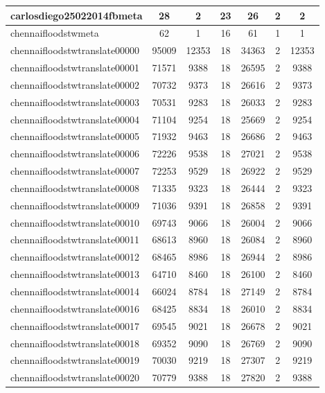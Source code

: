 \begin{table*}[h!]
\begin{center}
\begin{tabular}{| l | c | c | c | c | c | c |}
carlosdiego25022014fbmeta & 28  & 2  & 23  & 26  & 2  & 2 \\\hline
chennaifloodstwmeta & 62  & 1  & 16  & 61  & 1  & 1 \\\hline
chennaifloodstwtranslate00000 & 95009  & 12353  & 18  & 34363  & 2  & 12353 \\\hline
chennaifloodstwtranslate00001 & 71571  & 9388  & 18  & 26595  & 2  & 9388 \\\hline
chennaifloodstwtranslate00002 & 70732  & 9373  & 18  & 26616  & 2  & 9373 \\\hline
chennaifloodstwtranslate00003 & 70531  & 9283  & 18  & 26033  & 2  & 9283 \\\hline
chennaifloodstwtranslate00004 & 71104  & 9254  & 18  & 25669  & 2  & 9254 \\\hline
chennaifloodstwtranslate00005 & 71932  & 9463  & 18  & 26686  & 2  & 9463 \\\hline
chennaifloodstwtranslate00006 & 72226  & 9538  & 18  & 27021  & 2  & 9538 \\\hline
chennaifloodstwtranslate00007 & 72253  & 9529  & 18  & 26922  & 2  & 9529 \\\hline
chennaifloodstwtranslate00008 & 71335  & 9323  & 18  & 26444  & 2  & 9323 \\\hline
chennaifloodstwtranslate00009 & 71036  & 9391  & 18  & 26858  & 2  & 9391 \\\hline
chennaifloodstwtranslate00010 & 69743  & 9066  & 18  & 26004  & 2  & 9066 \\\hline
chennaifloodstwtranslate00011 & 68613  & 8960  & 18  & 26084  & 2  & 8960 \\\hline
chennaifloodstwtranslate00012 & 68465  & 8986  & 18  & 26944  & 2  & 8986 \\\hline
chennaifloodstwtranslate00013 & 64710  & 8460  & 18  & 26100  & 2  & 8460 \\\hline
chennaifloodstwtranslate00014 & 66024  & 8784  & 18  & 27149  & 2  & 8784 \\\hline
chennaifloodstwtranslate00016 & 68425  & 8834  & 18  & 26010  & 2  & 8834 \\\hline
chennaifloodstwtranslate00017 & 69545  & 9021  & 18  & 26678  & 2  & 9021 \\\hline
chennaifloodstwtranslate00018 & 69352  & 9090  & 18  & 26769  & 2  & 9090 \\\hline
chennaifloodstwtranslate00019 & 70030  & 9219  & 18  & 27307  & 2  & 9219 \\\hline
chennaifloodstwtranslate00020 & 70779  & 9388  & 18  & 27820  & 2  & 9388 \\\hline

\end{tabular}
\end{center}
\end{table*}
